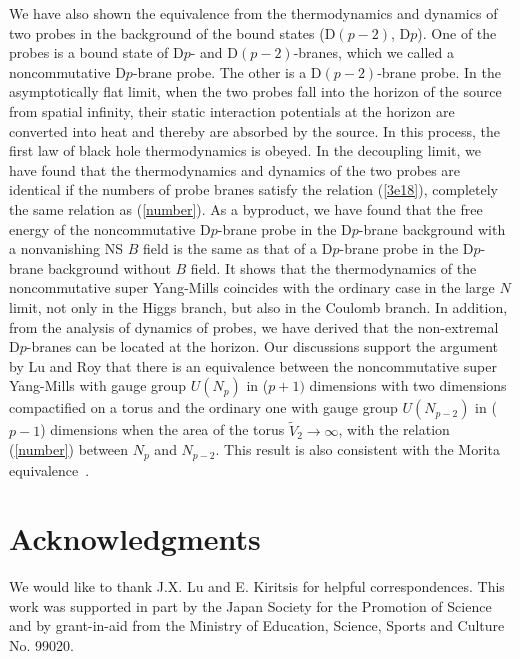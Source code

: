 \documentclass[a4paper,12pt]{article}
\begin{document}
We have also shown the equivalence from the thermodynamics and dynamics
of two probes in the background of the bound states (D$(p-2)$, D$p$). One
of the probes is a bound state of D$p$- and D$(p-2)$-branes, which we called
a noncommutative D$p$-brane probe. The other is a D$(p-2)$-brane probe.
In the asymptotically flat limit, when the two probes fall into the horizon
of the source from spatial infinity, their static interaction potentials
at the horizon  are converted into heat and thereby are absorbed by the
source. In this process, the first law of black hole thermodynamics is
obeyed. In the decoupling limit, we
have found that the thermodynamics and dynamics of the two probes are
identical if the numbers of probe branes satisfy the relation (\ref{3e18}),
completely the same relation as (\ref{number}). As a byproduct, we have
found that the free energy of the noncommutative D$p$-brane probe in the
D$p$-brane background with a nonvanishing NS $B$ field is the same as that
of a D$p$-brane probe in the D$p$-brane background without $B$ field. It shows
that the thermodynamics of the noncommutative super Yang-Mills coincides with
the ordinary case in the large $N$ limit, not only in the Higgs branch, but
also in the Coulomb branch. In addition, from the analysis of dynamics of
probes, we have derived that the non-extremal D$p$-branes can be located at
the horizon. Our discussions support the argument by Lu and Roy \cite{Lu}
that there is  an equivalence between the noncommutative super
Yang-Mills with gauge group $U(N_p)$ in ($p+1)$ dimensions with two dimensions
compactified on a torus and the ordinary one with gauge group
$U(N_{p-2})$ in ($p-1$) dimensions when the area of the torus $\tilde{V}_2
\rightarrow \infty$, with the relation (\ref{number}) between $N_p$ and
$N_{p-2}$. This result is also consistent with the Morita
equivalence~\cite{Hashimoto2}.


\section*{Acknowledgments}

We would like to thank J.X. Lu and E. Kiritsis for helpful correspondences.
This work was supported in part by the Japan Society for the Promotion of
Science and by grant-in-aid from the Ministry of Education, Science,
Sports and Culture No. 99020.
\end{document}
